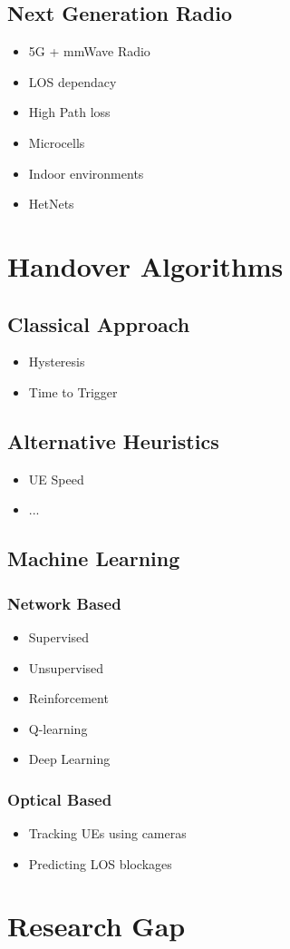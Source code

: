 \subsection{Next Generation Radio}
\begin{itemize}
    \item 5G + mmWave Radio
    \item LOS dependacy
    \item High Path loss
    \item Microcells
    \item Indoor environments
    \item HetNets
\end{itemize}
\section{Handover Algorithms}
\subsection{Classical Approach}
\begin{itemize}
    \item Hysteresis
    \item Time to Trigger
\end{itemize}
\subsection{Alternative Heuristics}
\begin{itemize}
    \item UE Speed
    \item ...
\end{itemize}
\subsection{Machine Learning}
\subsubsection{Network Based}
\begin{itemize}
    \item Supervised
    \item Unsupervised
    \item Reinforcement
    \setlength{\itemindent}{2em}
    \item Q-learning
    \item Deep Learning
\end{itemize}
\subsubsection{Optical Based}
\begin{itemize}
    \item Tracking UEs using cameras
    \item Predicting LOS blockages
\end{itemize}
\section{Research Gap}